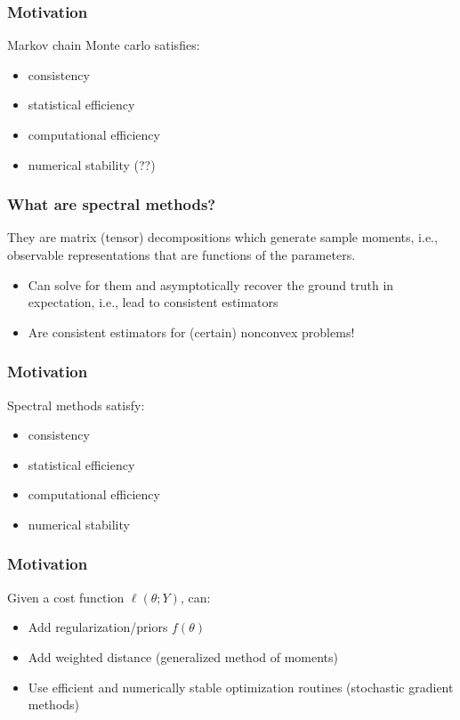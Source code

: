 \documentclass[10pt, compress]{beamer}
\newcommand{\cmark}{\ding{51}}%
\newcommand{\xmark}{\ding{55}}%
\begin{document}
\begin{frame}[fragile]
  \frametitle{Motivation}

  \alert{Markov chain Monte carlo} satisfies:
  \begin{itemize}
  \item consistency \cmark
  \item statistical efficiency \cmark
  \item computational efficiency \xmark
  \item numerical stability \xmark (??)
  \end{itemize}
\end{frame}

\begin{frame}[fragile]
  \frametitle{What are spectral methods?}

  They are matrix (tensor) decompositions which generate sample moments, i.e., observable representations that are functions of the parameters.
  \begin{itemize}
  \item Can solve for them and asymptotically recover the ground truth in expectation, i.e., lead to consistent estimators
  \item Are consistent estimators for (certain) nonconvex problems!
  \end{itemize}

\end{frame}

\begin{frame}[fragile]
  \frametitle{Motivation}

  \alert{Spectral methods} satisfy:
  \begin{itemize}
  \item consistency \cmark
  \item statistical efficiency \xmark
  \item computational efficiency \cmark
  \item numerical stability \xmark
  \end{itemize}
\end{frame}


\begin{frame}[fragile]
  \frametitle{Motivation}

  Given a cost function $\ell(\theta; Y)$, can:
  \begin{itemize}
  \item Add regularization/priors $f(\theta)$
  \item Add weighted distance (generalized method of moments)
  \item Use efficient and numerically stable optimization routines (stochastic gradient methods)
  \end{itemize}

\end{frame}
\end{document}
